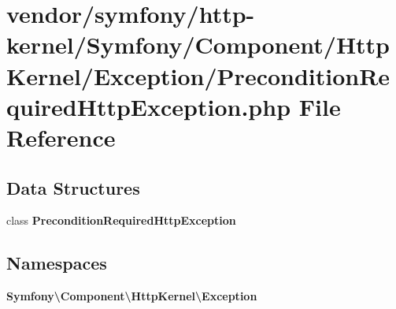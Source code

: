 \section{vendor/symfony/http-\/kernel/\+Symfony/\+Component/\+Http\+Kernel/\+Exception/\+Precondition\+Required\+Http\+Exception.php File Reference}
\label{_precondition_required_http_exception_8php}
\subsection*{Data Structures}
\begin{DoxyCompactItemize}
\item 
class {\bf Precondition\+Required\+Http\+Exception}
\end{DoxyCompactItemize}
\subsection*{Namespaces}
\begin{DoxyCompactItemize}
\item 
 {\bf Symfony\textbackslash{}\+Component\textbackslash{}\+Http\+Kernel\textbackslash{}\+Exception}
\end{DoxyCompactItemize}
